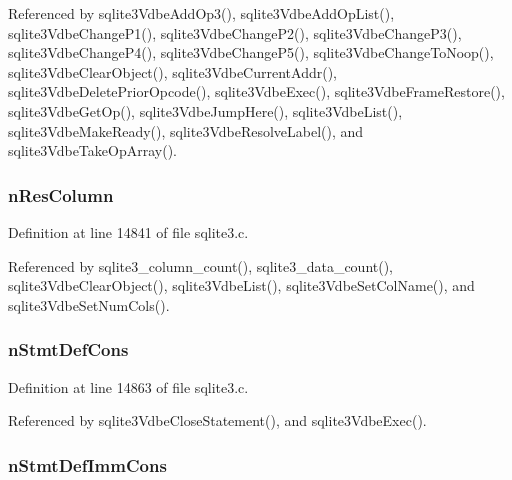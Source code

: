 Referenced by sqlite3\+Vdbe\+Add\+Op3(), sqlite3\+Vdbe\+Add\+Op\+List(), sqlite3\+Vdbe\+Change\+P1(), sqlite3\+Vdbe\+Change\+P2(), sqlite3\+Vdbe\+Change\+P3(), sqlite3\+Vdbe\+Change\+P4(), sqlite3\+Vdbe\+Change\+P5(), sqlite3\+Vdbe\+Change\+To\+Noop(), sqlite3\+Vdbe\+Clear\+Object(), sqlite3\+Vdbe\+Current\+Addr(), sqlite3\+Vdbe\+Delete\+Prior\+Opcode(), sqlite3\+Vdbe\+Exec(), sqlite3\+Vdbe\+Frame\+Restore(), sqlite3\+Vdbe\+Get\+Op(), sqlite3\+Vdbe\+Jump\+Here(), sqlite3\+Vdbe\+List(), sqlite3\+Vdbe\+Make\+Ready(), sqlite3\+Vdbe\+Resolve\+Label(), and sqlite3\+Vdbe\+Take\+Op\+Array().

\hypertarget{struct_vdbe_a649c97c1eaf660d353f0f37998b8fd56}{}
\subsubsection[{n\+Res\+Column}]{ n\+Res\+Column}\label{struct_vdbe_a649c97c1eaf660d353f0f37998b8fd56}


Definition at line 14841 of file sqlite3.\+c.



Referenced by sqlite3\+\_\+column\+\_\+count(), sqlite3\+\_\+data\+\_\+count(), sqlite3\+Vdbe\+Clear\+Object(), sqlite3\+Vdbe\+List(), sqlite3\+Vdbe\+Set\+Col\+Name(), and sqlite3\+Vdbe\+Set\+Num\+Cols().

\hypertarget{struct_vdbe_a03ed0e08938984b063b51e0d1e641286}{}
\subsubsection[{n\+Stmt\+Def\+Cons}]{ n\+Stmt\+Def\+Cons}\label{struct_vdbe_a03ed0e08938984b063b51e0d1e641286}


Definition at line 14863 of file sqlite3.\+c.



Referenced by sqlite3\+Vdbe\+Close\+Statement(), and sqlite3\+Vdbe\+Exec().

\hypertarget{struct_vdbe_aba61f311dc8398f1f6ae81dde76089e9}{}
\subsubsection[{n\+Stmt\+Def\+Imm\+Cons}]{ n\+Stmt\+Def\+Imm\+Cons}\label{struct_vdbe_aba61f311dc8398f1f6ae81dde76089e9}


